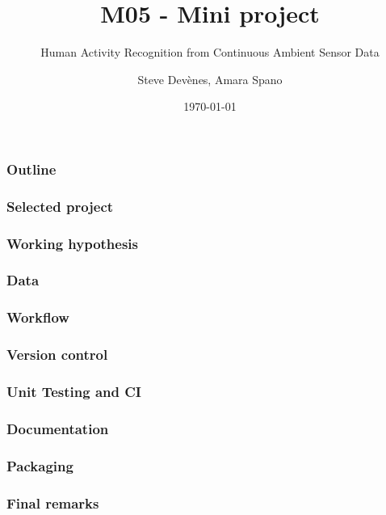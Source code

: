 \documentclass{beamer}
\title{M05 - Mini project}
\subtitle{Human Activity Recognition from Continuous Ambient Sensor Data}
\author{Steve Devènes, Amara Spano}
\institute{Unidistance}
\date{\today}
\begin{document}
	
	\begin{frame}
		\titlepage
	\end{frame}
	
	\begin{frame}
		\frametitle{Outline}
		\tableofcontents
	\end{frame}

	\begin{frame}
		\frametitle{Selected project}
	\end{frame}

	\begin{frame}
		\frametitle{Working hypothesis}
	\end{frame}

	\begin{frame}
		\frametitle{Data}
	\end{frame}

	\begin{frame}
		\frametitle{Workflow}
	\end{frame}

	\begin{frame}
		\frametitle{Version control}
	\end{frame}

	\begin{frame}
		\frametitle{Unit Testing and CI}
	\end{frame}

	\begin{frame}
		\frametitle{Documentation}
	\end{frame}

	\begin{frame}
		\frametitle{Packaging}
	\end{frame}

	\begin{frame}
		\frametitle{Final remarks}
	\end{frame}
\end{document}
